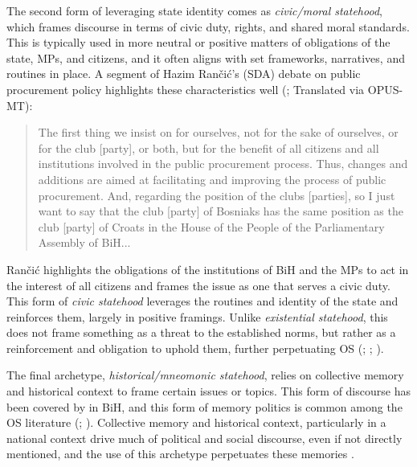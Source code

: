 The second form of leveraging state identity comes as \textit{civic/moral statehood}, which frames discourse in terms of civic duty, rights, and shared moral standards. This is typically used in more neutral or positive matters of obligations of the state, \acp{MP}, and citizens, and it often aligns with set frameworks, narratives, and routines in place. A segment of Hazim Ran{\v c}i{\'c}'s (\ac{SDA}) debate on public procurement policy highlights these characteristics well (\citealp{mochtak2022}; Translated via OPUS-MT):
\begin{quote}
    The first thing we insist on for ourselves, not for the sake of ourselves, or for the club [party], or both, but for the benefit of all citizens and all institutions involved in the public procurement process. Thus, changes and additions are aimed at facilitating and improving the process of public procurement. And, regarding the position of the clubs [parties], so I just want to say that the club [party] of Bosniaks has the same position as the club [party] of Croats in the House of the People of the Parliamentary Assembly of BiH...
\end{quote}
Ran{\v c}i{\'c} highlights the obligations of the institutions of \ac{BiH} and the \acp{MP} to act in the interest of all citizens and frames the issue as one that serves a civic duty. This form of \textit{civic statehood} leverages the routines and identity of the state and reinforces them, largely in positive framings. Unlike \textit{existential statehood}, this does not frame something as a threat to the established norms, but rather as a reinforcement and obligation to uphold them, further perpetuating \ac{OS} (\citealp[pg.~615-616]{subotic2015}; \citealp[pg.~251-253]{mitzenOntologicalSecurityWorld2006}; \citealp[pg.~276-277]{weldes1996}).

The final archetype, \textit{historical/mneomonic statehood}, relies on collective memory and historical context to frame certain issues or topics. This form of discourse has been covered by \citep[pg.~216-219]{davidPolicingMemoryBosnia2019} in \ac{BiH}, and this form of memory politics is common among the \ac{OS} literature (\citealp[pg.~614-615]{subotic2015}; \citealp[pg.~755-757]{kinnvall2004}). Collective memory and historical context, particularly in a national context drive much of political and social discourse, even if not directly mentioned, and the use of this archetype perpetuates these memories \citep[pg.~755-757]{kinnvall2004}. 





